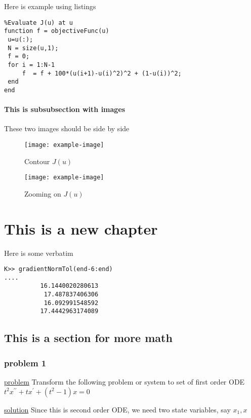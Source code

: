 \documentclass[11pt]{book}
\begin{document}
Here is example using listings

\begin{lstlisting}
%Evaluate J(u) at u
function f = objectiveFunc(u)
 u=u(:);
 N = size(u,1);
 f = 0;
 for i = 1:N-1
     f  = f + 100*(u(i+1)-u(i)^2)^2 + (1-u(i))^2;
 end
end
\end{lstlisting}


\subsubsection{This is subsubsection with images}

These two images should be side by side
\begin{figure}[H]
\centering
\begin{minipage}{0.48\textwidth}
\centering
\captionsetup{width=.8\textwidth}
\texttt{[image: example-image]}
\caption{Contour $J(u)$}
\end{minipage}
\hfill\begin{minipage}{0.48\textwidth}
\centering
\captionsetup{width=.8\textwidth}
\texttt{[image: example-image]}
\caption{Zooming on $J(u)$}
\end{minipage}
\end{figure}

\chapter{This is a new chapter}
Here is some verbatim

\begin{Verbatim}
K>> gradientNormTol(end-6:end)
....
          16.1440020280613
           17.487837406306
           16.092991548592
          17.4442963174089
\end{Verbatim}

\section{This is a section for more math}

\subsection{problem 1}
\underline{problem} Transform the following problem or system to set of first
order ODE $t^{2}x^{\prime\prime}+tx^{\prime}+\left(  t^{2}-1\right)  x=0$

\underline{solution} Since this is second order ODE, we need two state
variables, say $x_{1},x$
\end{document}
